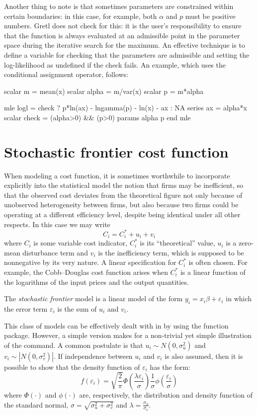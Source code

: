 Another thing to note is that sometimes parameters are constrained
within certain boundaries: in this case, for example, both $\alpha$
and $p$ must be positive numbers. Gretl does not check for this:
it is the user's responsibility to ensure that the function is
always evaluated at an admissible point in the parameter space during
the iterative search for the maximum. An effective technique is to
define a variable for checking that the parameters are admissible and
setting the log-likelihood as undefined if the check fails. An
example, which uses the conditional assignment operator, follows:
\begin{code}
scalar m = mean(x)
scalar alpha = m/var(x)
scalar p = m*alpha

mle logl = check ? p*ln(ax) - lngamma(p) - ln(x) - ax : NA
  series ax = alpha*x
  scalar check = (alpha>0) && (p>0)
  params alpha p
end mle 
\end{code}

\section{Stochastic frontier cost function}
\label{sec:frontier}

When modeling a cost function, it is sometimes worthwhile to
incorporate explicitly into the statistical model the notion that
firms may be inefficient, so that the observed cost deviates from the
theoretical figure not only because of unobserved heterogeneity
between firms, but also because two firms could be operating at a
different efficiency level, despite being identical under all other
respects. In this case we may write
\[
  C_i = C^*_i + u_i + v_i
\]
where $C_i$ is some variable cost indicator, $C_i^*$ is its
``theoretical'' value, $u_i$ is a zero-mean disturbance term and $v_i$
is the inefficiency term, which is supposed to be nonnegative by its
very nature. A linear specification for $C_i^*$ is often chosen. For
example, the Cobb--Douglas cost function arises when $C_i^*$ is a
linear function of the logarithms of the input prices and the output
quantities.

The \emph{stochastic frontier} model is a linear model of the form
$y_i = x_i \beta + \varepsilon_i$ in which the error term
$\varepsilon_i$ is the sum of $u_i$ and $v_i$.  

This class of models can be effectively dealt with in  by
using the  function package. However, a simple version
makes for a non-trivial yet simple illustration of the 
command. A common postulate is that $u_i \sim N(0,\sigma_u^2)$ and
$v_i \sim \left|N(0,\sigma_v^2)\right|$. If independence between $u_i$
and $v_i$ is also assumed, then it is possible to show that the
density function of $\varepsilon_i$ has the form:
\begin{equation}
  \label{eq:frontdens}
  f(\varepsilon_i) = 
   \sqrt{\frac{2}{\pi}} 
   \Phi\left(\frac{\lambda \varepsilon_i}{\sigma}\right)
   \frac{1}{\sigma} \phi\left(\frac{\varepsilon_i}{\sigma}\right)
\end{equation}
where $\Phi(\cdot)$ and $\phi(\cdot)$ are, respectively, the distribution and density
function of the standard normal, $\sigma =
\sqrt{\sigma^2_u + \sigma^2_v}$ and $\lambda = \frac{\sigma_u}{\sigma_v}$.

